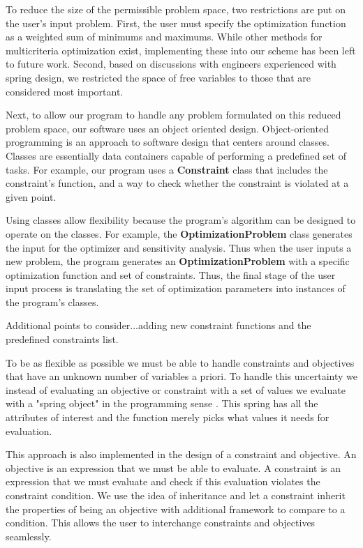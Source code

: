 \documentclass[10pt]{article}
\begin{document}
To reduce the size of the permissible problem space, two restrictions are put on the user's input problem.  First, the user must specify the optimization function as a weighted sum of minimums and maximums.  While other methods for multicriteria optimization exist, implementing these into our scheme has been left to future work.  Second, based on discussions with engineers experienced with spring design, we restricted the space of free variables to those that are considered most important.

Next, to allow our program to handle any problem formulated on this reduced problem space, our software uses an object oriented design.  Object-oriented programming is an approach to software design that centers around classes.  Classes are essentially data containers capable of performing a predefined set of tasks.  For example, our program uses a \textbf{Constraint} class that includes the constraint's function, and a way to check whether the constraint is violated at a given point.

Using classes allow flexibility because the program's algorithm can be designed to operate on the classes.  For example, the \textbf{OptimizationProblem} class generates the input for the optimizer and sensitivity analysis.  Thus when the user inputs a new problem, the program generates an \textbf{OptimizationProblem} with a specific optimization function and set of constraints.  Thus, the final stage of the user input process is translating the set of optimization parameters into instances of the program's classes.

Additional points to consider...adding new constraint functions and the predefined constraints list.

To be as flexible as possible we must be able to handle constraints and objectives that have an unknown number of  variables a priori. To handle this uncertainty we instead of evaluating an objective or constraint with a set of values we evaluate with a "spring object" in the programming sense \cite{OOP}. This spring has all the attributes of interest and the function merely picks what values it needs for evaluation. 

This approach is also implemented in the design of a constraint and objective. An objective is an expression that we must be able to evaluate. A constraint is an expression that we must evaluate and check if this evaluation violates the constraint condition. We use the idea of inheritance and let a constraint inherit the properties of being an objective with additional framework to compare to a condition. This allows the user to interchange constraints and objectives seamlessly.
\end{document}
